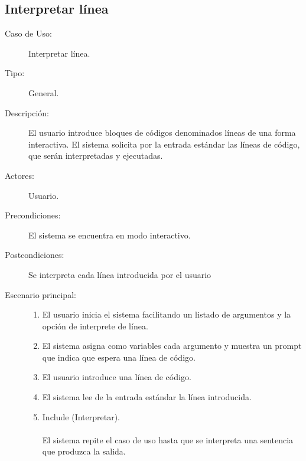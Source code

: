 \subsection{Interpretar línea}
\begin{framed}
\FloatBarrier
\begin{description}
   \item[Caso de Uso:]  Interpretar línea.
   \item[Tipo:] General.
   \item[Descripción:] 
   El usuario introduce bloques de códigos denominados líneas
   de una forma interactiva. El sistema solicita por la entrada 
   estándar las líneas de código, que serán interpretadas y ejecutadas.
   \item[Actores:] 
   Usuario.
   \item[Precondiciones:] 
   El sistema se encuentra en modo interactivo.
   \item[Postcondiciones:] 
   Se interpreta cada línea introducida por el usuario
   \item[Escenario principal:] \hfill
   \begin{enumerate}
   \item El usuario inicia el sistema facilitando un listado de argumentos y la opción de interprete de línea.
   \item El sistema asigna como variables cada argumento y muestra un prompt que indica que espera una línea de código.
   \item El usuario introduce una línea de código.
   \item El sistema lee de la entrada estándar la línea introducida.
   \item Include (Interpretar). \\\\\hfill\hfill
   El sistema repite el caso de uso hasta que se interpreta una sentencia que produzca 
   la salida.
   \end{enumerate}
\end{description}
 \FloatBarrier
\end{framed}
